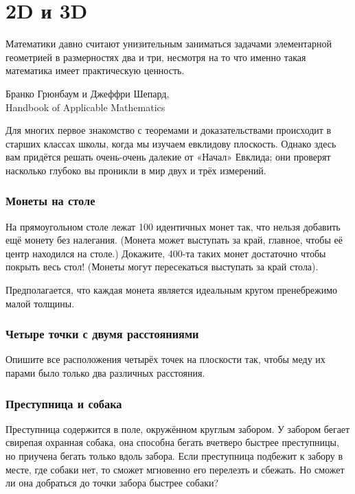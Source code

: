 \chapter{2D и 3D}

\setlength{\epigraphwidth}{.83\textwidth}
\epigraph{Математики давно считают унизительным заниматься задачами элементарной геометрией в размерностях два и три, несмотря на то что именно такая математика имеет практическую ценность.}{Бранко Грюнбаум и Джеффри Шепард,\\ Handbook of Applicable Mathematics}

Для многих первое знакомство с теоремами и доказательствами происходит в старших классах школы, когда мы изучаем евклидову плоскость.
Однако здесь вам придётся решать очень-очень далекие от «Начал» Евклида;
они проверят насколько глубоко вы проникли в мир двух и трёх измерений.

\subsection*{Монеты на столе}

На прямоугольном столе лежат 100 идентичных монет так, что нельзя добавить ещё монету без налегания.
(Монета может выступать за край, главное, чтобы её центр находился на столе.)
Докажите, 400-та таких монет достаточно чтобы покрыть весь стол!
(Монеты могут пересекаться выступать за край стола).

Предполагается, что каждая монета является идеальным кругом пренебрежимо малой толщины.

\subsection*{Четыре точки с двумя расстояниями}

Опишите все расположения четырёх точек на плоскости так, чтобы меду их парами было только два различных расстояния.

\subsection*{Преступница и собака}

Преступница содержится в поле, окружённом круглым забором.
У забором бегает свирепая охранная собака, она способна бегать вчетверо быстрее преступницы, но приучена бегать только вдоль забора.
Если преступница подбежит к забору в месте, где собаки нет, то сможет мгновенно его перелезть и сбежать.
Но сможет ли она добраться до точки забора быстрее собаки?

